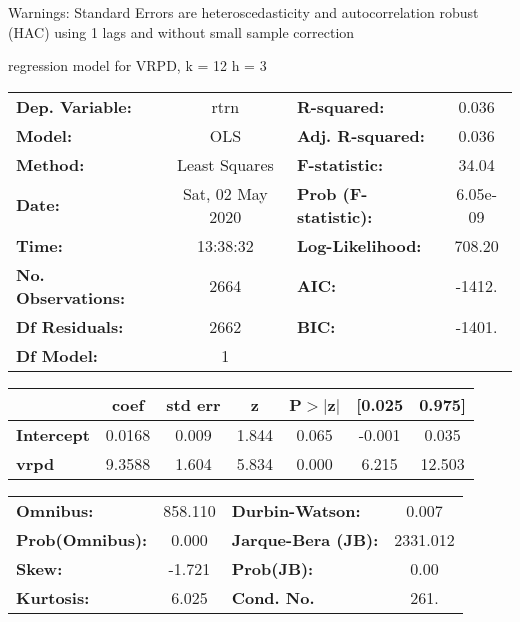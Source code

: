 Warnings: \newline
 [1] Standard Errors are heteroscedasticity and autocorrelation robust (HAC) using 1 lags and without small sample correction\ 

regression model for VRPD, k = 12 h = 3\begin{center}
\begin{tabular}{lclc}
\toprule
\textbf{Dep. Variable:}    &       rtrn       & \textbf{  R-squared:         } &     0.036   \\
\textbf{Model:}            &       OLS        & \textbf{  Adj. R-squared:    } &     0.036   \\
\textbf{Method:}           &  Least Squares   & \textbf{  F-statistic:       } &     34.04   \\
\textbf{Date:}             & Sat, 02 May 2020 & \textbf{  Prob (F-statistic):} &  6.05e-09   \\
\textbf{Time:}             &     13:38:32     & \textbf{  Log-Likelihood:    } &    708.20   \\
\textbf{No. Observations:} &        2664      & \textbf{  AIC:               } &    -1412.   \\
\textbf{Df Residuals:}     &        2662      & \textbf{  BIC:               } &    -1401.   \\
\textbf{Df Model:}         &           1      & \textbf{                     } &             \\
\bottomrule
\end{tabular}
\begin{tabular}{lcccccc}
                   & \textbf{coef} & \textbf{std err} & \textbf{z} & \textbf{P$> |$z$|$} & \textbf{[0.025} & \textbf{0.975]}  \\
\midrule
\textbf{Intercept} &       0.0168  &        0.009     &     1.844  &         0.065        &       -0.001    &        0.035     \\
\textbf{vrpd}      &       9.3588  &        1.604     &     5.834  &         0.000        &        6.215    &       12.503     \\
\bottomrule
\end{tabular}
\begin{tabular}{lclc}
\textbf{Omnibus:}       & 858.110 & \textbf{  Durbin-Watson:     } &    0.007  \\
\textbf{Prob(Omnibus):} &   0.000 & \textbf{  Jarque-Bera (JB):  } & 2331.012  \\
\textbf{Skew:}          &  -1.721 & \textbf{  Prob(JB):          } &     0.00  \\
\textbf{Kurtosis:}      &   6.025 & \textbf{  Cond. No.          } &     261.  \\
\bottomrule
\end{tabular}
\end{center}


